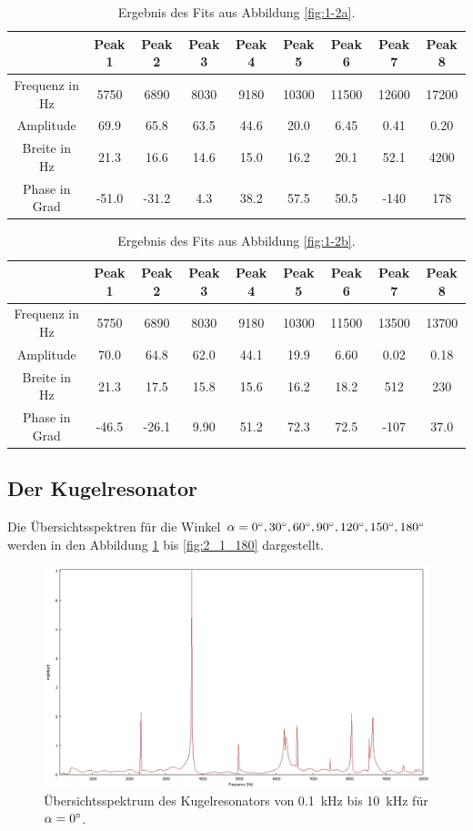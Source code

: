 \begin{table}
\centering
\caption{Ergebnis des Fits aus Abbildung \ref{fig:1-2a}.}
\label{tab:1:1}
\begin{tabular}{c c c c c c c c c}
\hline
 & Peak 1 & Peak 2 & Peak 3 & Peak 4 & Peak 5 & Peak 6&Peak 7&Peak 8 \\ \hline

Frequenz in Hz& 5750&6890&8030&9180&10300&11500&12600&17200\\
Amplitude&69.9&65.8&63.5&44.6&20.0&6.45&0.41&0.20\\
Breite in Hz&21.3&16.6&14.6&15.0&16.2&20.1&52.1&4200\\
Phase in Grad&-51.0&-31.2&4.3&38.2&57.5&50.5&-140&178\\
\hline
\end{tabular}
\end{table}

\begin{table}
\centering
\caption{Ergebnis des Fits aus Abbildung \ref{fig:1-2b}.}
\label{tab:1:2}
\begin{tabular}{c c c c c c c c c}
\hline
 & Peak 1 & Peak 2 & Peak 3 & Peak 4 & Peak 5 & Peak 6&Peak 7&Peak 8 \\ \hline

Frequenz in Hz&5750&6890&8030&9180&10300&11500&13500&13700\\
Amplitude&70.0&64.8&62.0&44.1&19.9&6.60&0.02&0.18\\
Breite in Hz&21.3&17.5&15.8&15.6&16.2&18.2&512&230\\
Phase in Grad&-46.5&-26.1&9.90&51.2&72.3&72.5&-107&37.0\\
\hline
\end{tabular}
\end{table}
\FloatBarrier
\subsection{Der Kugelresonator}
\label{subsec:Der Kugelresonator}
Die Übersichtsspektren für die Winkel $\alpha=0\degree,30\degree,60\degree,90\degree,120\degree,150\degree,180\degree$ werden in den Abbildung \ref{fig:2_1_0} bis \ref{fig:2_1_180} dargestellt.
\begin{figure}
\centering
\includegraphics[width=\textwidth]{content/messungen/Chapter2new/2_1_0img.jpg}
\caption{Übersichtsspektrum des Kugelresonators von 0.1~kHz bis 10~kHz für $\alpha=0\degree$.}
\label{fig:2_1_0}
\end{figure}

